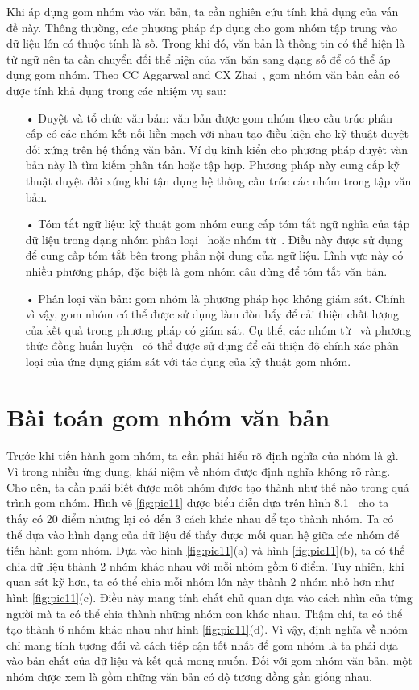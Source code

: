 Khi áp dụng gom nhóm vào văn bản, ta cần nghiên cứu tính khả dụng của vấn đề này.
Thông thường, các phương pháp áp dụng cho gom nhóm tập trung vào dữ liệu lớn có thuộc tính là số.
Trong khi đó, văn bản là thông tin có thể hiện là từ ngữ nên ta cần chuyển đổi thể hiện của văn bản sang dạng số để có thể áp dụng gom nhóm.
Theo CC Aggarwal and CX Zhai~\cite{text-cluster}, gom nhóm văn bản cần có được tính khả dụng trong các nhiệm vụ sau:
\begin{enumerate}
\item[•]Duyệt và tổ chức văn bản: văn bản được gom nhóm theo cấu trúc phân cấp có các nhóm kết nối liền mạch với nhau tạo điều kiện cho kỹ thuật duyệt đối xứng trên hệ thống văn bản.
Ví dụ kinh kiển cho phương pháp duyệt văn bản này là tìm kiếm phân tán hoặc tập hợp.
Phương pháp này cung cấp kỹ thuật duyệt đối xứng khi tận dụng hệ thống cấu trúc các nhóm trong tập văn bản.
\item[•]Tóm tắt ngữ liệu: kỹ thuật gom nhóm cung cấp tóm tắt ngữ nghĩa của tập dữ liệu trong dạng nhóm phân loại~\cite{cluster-digest} hoặc nhóm từ~\cite{cluster-word-1,cluster-word-2}.
Điều này được sử dụng để cung cấp tóm tắt bên trong phần nội dung của ngữ liệu.
Lĩnh vực này có nhiều phương pháp, đặc biệt là gom nhóm câu dùng để tóm tắt văn bản.
\item[•]Phân loại văn bản: gom nhóm là phương pháp học không giám sát.
Chính vì vậy, gom nhóm có thể được sử dụng làm đòn bẩy để cải thiện chất lượng của kết quả trong phương pháp có giám sát.
Cụ thể, các nhóm từ~\cite{cluster-word-1, cluster-word-2} và phương thức đồng huấn luyện~\cite{cluster-word-3} có thể được sử dụng để cải thiện độ chính xác phân loại của ứng dụng giám sát với tác dụng của kỹ thuật gom nhóm.
\end{enumerate}

\section{Bài toán gom nhóm văn bản}
Trước khi tiến hành gom nhóm, ta cần phải hiểu rõ định nghĩa của nhóm là gì.
Vì trong nhiều ứng dụng, khái niệm về nhóm được định nghĩa không rõ ràng.
Cho nên, ta cần phải biết được một nhóm được tạo thành như thế nào trong quá trình gom nhóm.
Hình vẽ \ref{fig:pic11} được biểu diễn dựa trên hình 8.1~\cite{Vipin-Kumar} cho ta thấy có 20 điểm nhưng lại có đến 3 cách khác nhau để tạo thành nhóm.
Ta có thể dựa vào hình dạng của dữ liệu để thấy được mối quan hệ giữa các nhóm để tiến hành gom nhóm.
Dựa vào hình \ref{fig:pic11}(a) và hình \ref{fig:pic11}(b), ta có thể chia dữ liệu thành 2 nhóm khác nhau với mỗi nhóm gồm 6 điểm.
Tuy nhiên, khi quan sát kỹ hơn, ta có thể chia mỗi nhóm lớn này thành 2 nhóm nhỏ hơn như hình \ref{fig:pic11}(c).
Điều này mang tính chất chủ quan dựa vào cách nhìn của từng người mà ta có thể chia thành những nhóm con khác nhau.
Thậm chí, ta có thể tạo thành 6 nhóm khác nhau như hình \ref{fig:pic11}(d).
Vì vậy, định nghĩa về nhóm chỉ mang tính tương đối và cách tiếp cận tốt nhất để gom nhóm là ta phải dựa vào bản chất của dữ liệu và kết quả mong muốn.
Đối với gom nhóm văn bản, một nhóm được xem là gồm những văn bản có độ tương đồng gần giống nhau.

